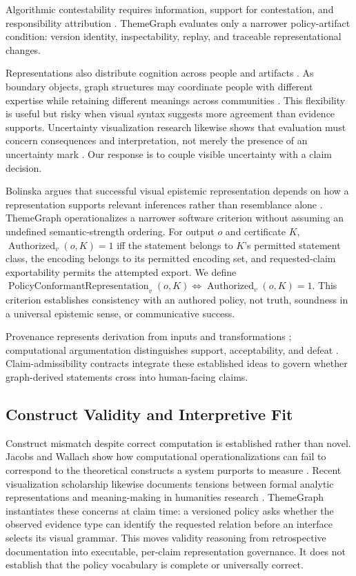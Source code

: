 \documentclass[manuscript,screen,review]{acmart}
\begin{document}
Algorithmic contestability requires information, support for contestation, and responsibility attribution \cite{yurrita2025}. ThemeGraph evaluates only a narrower policy-artifact condition: version identity, inspectability, replay, and traceable representational changes.

Representations also distribute cognition across people and artifacts \cite{hutchins1995}. As boundary objects, graph structures may coordinate people with different expertise while retaining different meanings across communities \cite{star1989}. This flexibility is useful but risky when visual syntax suggests more agreement than evidence supports. Uncertainty visualization research likewise shows that evaluation must concern consequences and interpretation, not merely the presence of an uncertainty mark \cite{hullman2019}. Our response is to couple visible uncertainty with a claim decision.

Bolinska argues that successful visual epistemic representation depends on how a representation supports relevant inferences rather than resemblance alone \cite{bolinska2016}. ThemeGraph operationalizes a narrower software criterion without assuming an undefined semantic-strength ordering. For output $o$ and certificate $K$, $\operatorname{Authorized}_v(o,K)=1$ iff the statement belongs to $K$'s permitted statement class, the encoding belongs to its permitted encoding set, and requested-claim exportability permits the attempted export. We define $\operatorname{PolicyConformantRepresentation}_v(o,K)\Leftrightarrow\operatorname{Authorized}_v(o,K)=1$. This criterion establishes consistency with an authored policy, not truth, soundness in a universal epistemic sense, or communicative success.

Provenance represents derivation from inputs and transformations \cite{green2007}; computational argumentation distinguishes support, acceptability, and defeat \cite{dung1995}. Claim-admissibility contracts integrate these established ideas to govern whether graph-derived statements cross into human-facing claims.

\subsection{Construct Validity and Interpretive Fit}

Construct mismatch despite correct computation is established rather than novel. Jacobs and Wallach show how computational operationalizations can fail to correspond to the theoretical constructs a system purports to measure \cite{jacobs2021}. Recent visualization scholarship likewise documents tensions between formal analytic representations and meaning-making in humanities research \cite{benitosantos2026}. ThemeGraph instantiates these concerns at claim time: a versioned policy asks whether the observed evidence type can identify the requested relation before an interface selects its visual grammar. This moves validity reasoning from retrospective documentation into executable, per-claim representation governance. It does not establish that the policy vocabulary is complete or universally correct.
\end{document}
